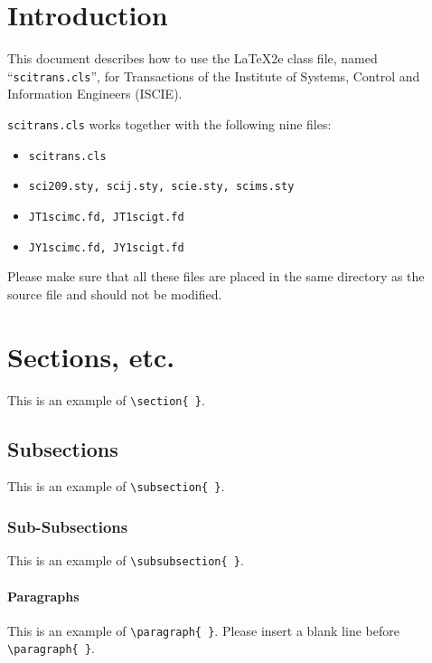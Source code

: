 
\section{Introduction}
This document describes how to use the \LaTeX2e class file, named 
``{\tt scitrans.cls}'', for Transactions of the Institute of Systems, 
Control and Information Engineers (ISCIE). 

{\tt scitrans.cls} works together with the following nine files: 
\begin{itemize}
\item {\tt scitrans.cls}
\item {\tt sci209.sty, scij.sty, scie.sty, scims.sty}
\item {\tt JT1scimc.fd, JT1scigt.fd}
\item {\tt JY1scimc.fd, JY1scigt.fd}
\end{itemize}
Please make sure that all these files are placed in the same directory 
as the source file and should not be modified.


\section{Sections, etc.}
This is an example of \verb+\section{ }+.

\subsection{Subsections}
This is an example of \verb+\subsection{ }+.

\subsubsection{Sub-Subsections}
This is an example of \verb+\subsubsection{ }+.


\paragraph{Paragraphs}
This is an example of \verb+\paragraph{ }+.
Please insert a blank line before \verb+\paragraph{ }+.



